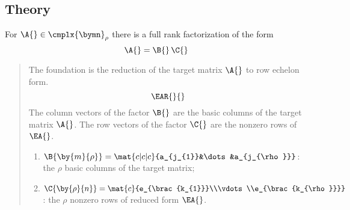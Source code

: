 \subsection{Theory}
For $\A{}\in\cmplx{\bymn}_{\rho}$ there is a full rank factorization of the form
\begin{equation}
  \A{}=\B{}\,\C{}
\end{equation}
\begin{quote}
The foundation is the reduction of the target matrix $\A{}$ to row echelon form.
\begin{equation}
  \EAR{}{} 
\end{equation}
The column vectors of the factor $\B{}$ are the basic columns of the target matrix $\A{}$. The row vectors of the factor $\C{}$ are the nonzero rows of $\EA{}$.
\begin{enumerate}
\item $\B{\by{m}{\rho}} = \mat{c|c|c}{a_{j_{1}}&\dots&a_{j_{\rho}}}$: the $\rho$ basic columns of the target matrix;
\item $\C{\by{\rho}{n}} = \mat{c}{e_{\brac{k_{1}}}\\\vdots\\e_{\brac{k_{\rho}}}}$: the $\rho$ nonzero rows of reduced form $\EA{}$.
\end{enumerate}
\end{quote}
